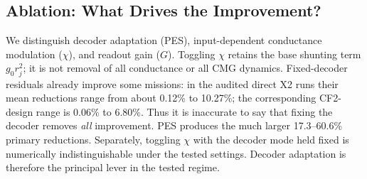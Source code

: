 \documentclass[letterpaper, 10 pt, conference]{ieeeconf}
\newcommand{\clip}{\operatorname{clip}}
\begin{document}
\subsection{Ablation: What Drives the Improvement?}\label{sec:ablation}

We distinguish decoder adaptation (PES), input-dependent conductance modulation ($\chi$), and readout gain ($G$). Toggling $\chi$ retains the base shunting term $g_0r_j^2$; it is not removal of all conductance or all CMG dynamics.
Fixed-decoder residuals already improve some missions: in the audited direct
X2 runs their mean reductions range from about 0.12\% to 10.27\%; the
corresponding CF2-design range is 0.06\% to 6.80\%. Thus it is inaccurate
to say that fixing the decoder removes \emph{all} improvement. PES produces
the much larger 17.3--60.6\% primary reductions. Separately, toggling
$\chi$ with the decoder mode held fixed is numerically indistinguishable
under the tested settings. Decoder adaptation is therefore the principal lever in the tested regime.



\end{document}
